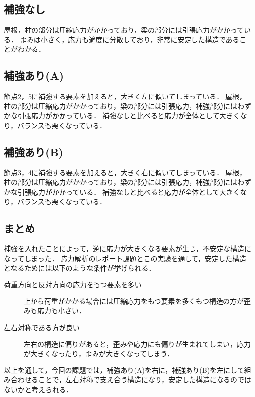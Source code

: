 \documentclass[a4paper,11pt,uplatex]{jsarticle}
\begin{document}
\subsection{補強なし}
屋根，柱の部分は圧縮応力がかかっており，梁の部分には引張応力がかかっている．
歪みは小さく，応力も適度に分散しており，非常に安定した構造であることがわかる．
\subsection{補強あり(A)}
節点2，5に補強する要素を加えると，大きく左に傾いてしまっている．
屋根，柱の部分は圧縮応力がかかっており，梁の部分には引張応力，補強部分にはわずかな引張応力がかかっている．
補強なしと比べると応力が全体として大きくなり，バランスも悪くなっている．
\subsection{補強あり(B)}
節点3，4に補強する要素を加えると，大きく右に傾いてしまっている．
屋根，柱の部分は圧縮応力がかかっており，梁の部分には引張応力，補強部分にはわずかな引張応力がかかっている．
補強なしと比べると応力が全体として大きくなり，バランスも悪くなっている．
\subsection{まとめ}
補強を入れたことによって，逆に応力が大きくなる要素が生じ，不安定な構造になってしまった．
応力解析のレポート課題とこの実験を通して，安定した構造となるためには以下のような条件が挙げられる．
\begin{description}
  \item[荷重方向と反対方向の応力をもつ要素を多い]上から荷重がかかる場合には圧縮応力をもつ要素を多くもつ構造の方が歪みも応力も小さい．
  \item[左右対称である方が良い]左右の構造に偏りがあると，歪みや応力にも偏りが生まれてしまい，応力が大きくなったり，歪みが大きくなってしまう．
\end{description}
以上を通して，今回の課題では，補強あり(A)を右に，補強あり(B)を左にして組み合わせることで，左右対称で支え合う構造になり，安定した構造になるのではないかと考えられる．
\end{document}
